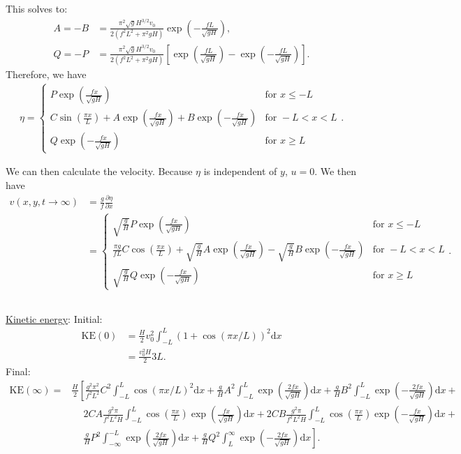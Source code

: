 \documentclass[11pt,letterpaper]{book}
\theoremstyle{definition}
\newcommand{\de}{\mathrm{d}}
\newcommand{\pe}{\partial}
\begin{document}
This solves to:
\begin{align*}
A = -B&= \frac{\pi ^2 \sqrt{g} H^{3/2} v_0 }{2 \left(f^2 L^2+\pi ^2 g H\right)}\exp\left({-\frac{f L}{\sqrt{gH}}}\right),\\
Q = -P&= \frac{\pi ^2 \sqrt{g} H^{3/2} v_0 }{2 \left(f^2 L^2+\pi ^2 g H\right)}\left[ \exp\left({\frac{f L}{\sqrt{gH}}}\right)-\exp\left({-\frac{f L}{\sqrt{gH}}}\right) \right].
\end{align*}
Therefore, we have
\begin{align*}
\eta = \begin{cases}
P \exp\left({\frac{f x}{\sqrt{gH}}}\right) &\text{for }x\leq -L\\
C\sin\left(\frac{\pi x}{L}\right)+A \exp\left({\frac{f x}{\sqrt{gH}}}\right) +B \exp\left({-\frac{f x}{\sqrt{gH}}}\right) &\text{for } -L<x<L\\
Q \exp\left({-\frac{f x}{\sqrt{gH}}}\right)&\text{for }x\geq L
\end{cases}.
\end{align*}

We can then calculate the velocity. Because $\eta$ is independent of $y$, $u=0$. We then have
\begin{align*}
v(x,y,t\to\infty) &= \frac{g}{f}\frac{\pe \eta}{\pe x}\\
&=  \begin{cases}
{\sqrt{\frac{g}{H}}}P \exp\left({\frac{f x}{\sqrt{gH}}}\right) &\text{for }x\leq -L\\
\frac{\pi g}{fL} C\cos\left(\frac{\pi x}{L}\right)+{\sqrt{\frac{g}{H}}}A \exp\left({\frac{f x}{\sqrt{gH}}}\right) -{\sqrt{\frac{g}{H}}}B \exp\left({-\frac{f x}{\sqrt{gH}}}\right) &\text{for } -L<x<L\\
{\sqrt{\frac{g}{H}}}Q \exp\left({-\frac{f x}{\sqrt{gH}}}\right)&\text{for }x\geq L
\end{cases}.
\end{align*}

\subsection{}
\underline{Kinetic energy}: Initial:
\begin{align*}
\text{KE}(0) &= \frac{H}{2}v_0^2\int^L_{-L}(1+\cos(\pi x/L))^2\de x\\
&= \frac{v_0^2H}{2}3L.
\end{align*}
Final:
\begin{align*}
\text{KE}(\infty) =& \frac{H}{2}\left[\frac{g^2\pi^2}{f^2L^2}C^2\int^L_{-L}  \cos\left(\pi x/L\right)^2 \de x+ 
\frac{g}{H} A^2\int^L_{-L}\exp\left(\frac{2fx}{\sqrt{gH}}\right)\de x +
\frac{g}{H}B^2\int^L_{-L}\exp\left(-\frac{2fx}{\sqrt{gH}}\right)\de x   \right.+\\
&\quad\ \left. 2CA\frac{g^2\pi}{f^2 L^2 H}\int^L_{-L}\cos\left(\frac{\pi x}{L}\right)\exp\left(\frac{fx}{\sqrt{gH}}\right)\de x + 2CB\frac{g^2\pi}{f^2 L^2 H}\int^L_{-L}\cos\left(\frac{\pi x}{L}\right)\exp\left(-\frac{fx}{\sqrt{gH}}\right)\de x \right.+\\
&\quad\ \left.\frac{g}{H}P^2\int^{-L}_{-\infty}\exp\left(\frac{2fx}{\sqrt{gH}}\right)\de x+
\frac{g}{H}Q^2\int^{\infty}_{L}\exp\left(-\frac{2fx}{\sqrt{gH}}\right)\de x\right].
\end{align*}
\end{document}
